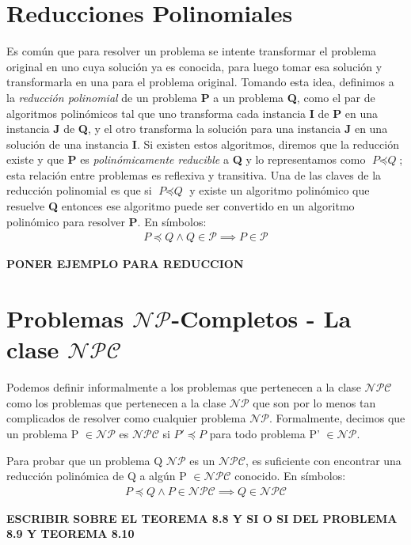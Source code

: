 \documentclass{article}
\begin{document}
\section*{Reducciones Polinomiales}
\indent Es común que para resolver un problema se intente transformar el problema original en uno cuya solución ya es conocida, para luego tomar esa solución y transformarla en una para el problema original. Tomando esta idea, definimos a la \textit{reducción polinomial} de un problema \textbf{P} a un problema \textbf{Q}, como el par de algoritmos polinómicos tal que uno transforma cada instancia \textbf{I} de \textbf{P} en una instancia \textbf{J} de \textbf{Q}, y el otro transforma la solución para una instancia \textbf{J} en una solución de una instancia \textbf{I}. Si existen estos algoritmos, diremos que la reducción existe y que \textbf{P} es \textit{polinómicamente reducible} a \textbf{Q} y lo representamos como $\textit{P} \preceq \textit{Q}$; esta relación entre problemas es reflexiva y transitiva.\newline
\indent Una de las claves de la reducción polinomial es que si $\textit{P} \preceq \textit{Q}$ y existe un algoritmo polinómico que resuelve \textbf{Q} entonces ese algoritmo puede ser convertido en un algoritmo polinómico para resolver \textbf{P}. En símbolos:
\begin{align*}
    P \preceq Q \land Q \in \mathcal{P} \implies P \in \mathcal{P}
\end{align*}

\textbf{PONER EJEMPLO PARA REDUCCION}


\section*{Problemas $\mathcal{NP}$-Completos  -   La clase $\mathcal{NPC}$}
Podemos definir informalmente a los problemas que pertenecen a la clase $\mathcal{NPC}$ como los problemas que pertenecen a la clase $\mathcal{NP}$ que son por lo menos tan complicados de resolver como cualquier problema $\mathcal{NP}$. Formalmente, decimos que un problema P $\in \mathcal{NP}$ es $\mathcal{NPC}$ si $P' \preceq P$ para todo problema P' $\in \mathcal{NP}$.

Para probar que un problema Q $\mathcal{NP}$ es un $\mathcal{NPC}$, es suficiente con encontrar una reducción polinómica de Q a algún P $\in \mathcal{NPC}$ conocido. En símbolos:
\begin{align*}
    P \preceq Q \land P \in \mathcal{NPC} \implies Q\in   \mathcal{NPC}
\end{align*}

\textbf{ESCRIBIR SOBRE EL TEOREMA 8.8 Y SI O SI DEL PROBLEMA 8.9 Y TEOREMA 8.10}
\end{document}
